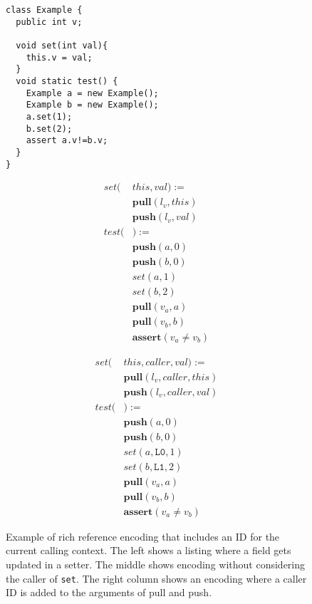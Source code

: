 \begin{figure}[ht]
\centering
\begin{minipage}{.3\textwidth}
\begin{lstlisting}
class Example {
  public int v;

  void set(int val){
    this.v = val;
  }
  void static test() {
    Example a = new Example();
    Example b = new Example();
    a.set(1);
    b.set(2);
    assert a.v!=b.v;
  }
}
\end{lstlisting}
\end{minipage}
\begin{minipage}{.3\textwidth}
\begin{align*}
set( & this, val)  := \\ 
& \textbf{pull}(l_v, this)\\
& \textbf{push}(l_v, val)\\
test(&)  := \\ 
& \textbf{push}(a, 0)\\
& \textbf{push}(b, 0)\\
& set(a, 1) \\
& set(b, 2) \\
& \textbf{pull}(v_a, a)\\
& \textbf{pull}(v_b, b)\\
& \textbf{assert}(v_a\neq v_b)
\end{align*}
\end{minipage}
\begin{minipage}{.3\textwidth}
\begin{align*}
set(& this, caller, val) := \\ 
& \textbf{pull}(l_v, caller, this)\\
& \textbf{push}(l_v, caller, val)\\
test(& )  := \\ 
& \textbf{push}(a, 0)\\
& \textbf{push}(b, 0)\\
& set(a, \texttt{L0}, 1) \\
& set(b, \texttt{L1}, 2) \\
& \textbf{pull}(v_a, a)\\
& \textbf{pull}(v_b, b)\\
& \textbf{assert}(v_a\neq v_b)
\end{align*}
\end{minipage}
\caption{Example of rich reference encoding that includes an ID for the current calling context. The left shows a listing where a field gets updated in a setter.
The middle shows encoding without considering the caller of \texttt{set}. The 
right column shows an encoding where a caller ID is
added to the arguments of pull and push.}
\label{fig-caller-id}
\end{figure}

